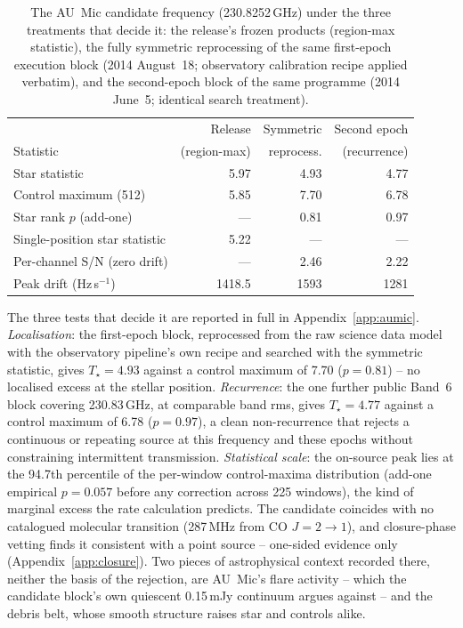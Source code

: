 \documentclass{openjournal}
\begin{document}
\begin{table}
\centering
\small
\setlength{\tabcolsep}{4pt}
\caption{The AU~Mic candidate frequency (230.8252\,GHz) under the
three treatments that decide it: the release's frozen products
(region-max statistic), the fully symmetric reprocessing of the same
first-epoch execution block (2014 August~18; observatory calibration
recipe applied verbatim), and the second-epoch block of the same
programme (2014 June~5; identical search treatment).}
\label{tab:aumic}
\begin{tabular}{@{}lrrr@{}}
\toprule
 & Release & Symmetric & Second epoch \\
Statistic & (region-max) & reprocess. & (recurrence) \\
\midrule
Star statistic & 5.97 & 4.93 & 4.77 \\
Control maximum (512) & 5.85 & 7.70 & 6.78 \\
Star rank $p$ (add-one) & --- & 0.81 & 0.97 \\
Single-position star statistic & 5.22 & --- & --- \\
Per-channel S/N (zero drift) & --- & 2.46 & 2.22 \\
Peak drift (Hz\,s$^{-1}$) & 1418.5 & 1593 & 1281 \\
\bottomrule
\end{tabular}
\end{table}

The three tests that decide it are reported in full in
Appendix~\ref{app:aumic}. \emph{Localisation}: the first-epoch block,
reprocessed from the raw science data model with the observatory
pipeline's own recipe and searched with the symmetric statistic, gives
$T_\star=4.93$ against a control maximum of 7.70 ($p=0.81$) -- no
localised excess at the stellar position. \emph{Recurrence}: the one
further public Band~6 block covering 230.83\,GHz, at comparable band
rms, gives $T_\star=4.77$ against a control maximum of 6.78
($p=0.97$), a clean non-recurrence that rejects a continuous or
repeating source at this frequency and these epochs without
constraining intermittent transmission. \emph{Statistical scale}: the
on-source peak lies at the 94.7th percentile of the per-window
control-maxima distribution (add-one empirical $p=0.057$ before any
correction across 225 windows), the kind of marginal excess the rate
calculation predicts. The candidate coincides with no catalogued
molecular transition (287\,MHz from CO $J{=}2{\to}1$), and
closure-phase vetting finds it consistent with a point source --
one-sided evidence only (Appendix~\ref{app:closure}). Two pieces of
astrophysical context recorded there, neither the basis of the
rejection, are AU~Mic's flare activity -- which the candidate block's
own quiescent 0.15\,mJy continuum argues against -- and the debris
belt, whose smooth structure raises star and controls alike.
\end{document}
